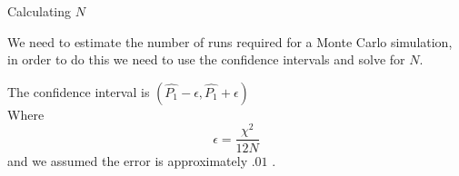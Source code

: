  
\begin{frame}{Calculating $N$}
	
	\vfill
	
	We need to estimate the number of runs required for a Monte Carlo simulation, in order to do this we need to use the confidence intervals and solve for $N$. 
	
	\vfill
	
	The confidence interval is $\left(\hat{P_1} - \epsilon , \hat{P_1} + \epsilon \right)$ \\
	Where $$\epsilon =\frac{\chi^2}{12N}$$ and we assumed the error is approximately $.01$ .
		
	\vfill
		
\end{frame}